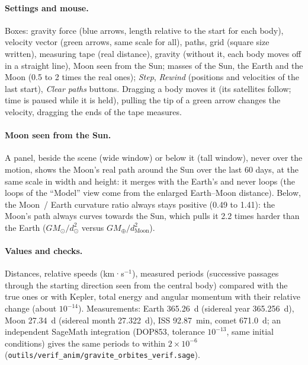 \paragraph{Settings and mouse.} Boxes: gravity force (blue arrows, length relative to the start for each body),
velocity vector (green arrows, same scale for all), paths, grid (square size written), measuring tape (real distance),
gravity (without it, each body moves off in a straight line), Moon seen from the Sun; masses of the Sun, the Earth and
the Moon (0.5 to 2 times the real ones); \emph{Step}, \emph{Rewind} (positions and velocities of the last start),
\emph{Clear paths} buttons. Dragging a body moves it (its satellites follow; time is paused while it is held), pulling
the tip of a green arrow changes the velocity, dragging the ends of the tape measures.

\paragraph{Moon seen from the Sun.} A panel, beside the scene (wide window) or below it (tall window), never over the motion, shows the Moon's real path around the Sun over the last 60 days, at the
same scale in width and height: it merges with the Earth's and never loops (the loops of the “Model” view come from
the enlarged Earth--Moon distance). Below, the Moon~/ Earth curvature ratio always stays positive (0.49 to 1.41): the
Moon's path always curves towards the Sun, which pulls it 2.2 times harder than the Earth ($GM_\odot/d_\odot^2$ versus
$GM_\oplus/d_{\mathrm{Moon}}^2$).

\paragraph{Values and checks.} Distances, relative speeds (km·s$^{-1}$), measured periods (successive passages
through the starting direction seen from the central body) compared with the true ones or with Kepler, total energy
and angular momentum with their relative change (about $10^{-14}$). Measurements: Earth 365.26~d (sidereal year
365.256~d), Moon 27.34~d (sidereal month 27.322~d), ISS 92.87~min, comet 671.0~d; an independent SageMath integration
(DOP853, tolerance $10^{-13}$, same initial conditions) gives the same periods to within $2\times10^{-6}$
(\texttt{outils/verif\_anim/gravite\_orbites\_verif.sage}).

